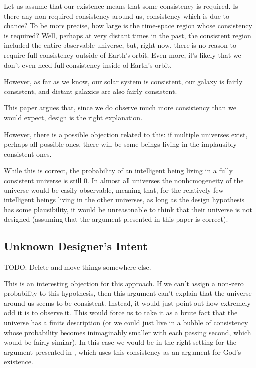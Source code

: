 \documentclass[a4paper
,draft
]{article}
\newcommand{\paper}[1]{paper}
\begin{document}
Let us assume that our existence means that some consistency is required.
Is there any non-required consistency around us, consistency which is due to
chance? To be more precise,
how large is the time-space region whose consistency is required? Well,
perhaps at very distant times in the past, the consistent region included
the entire observable universe, but, right now, there is no reason to require
full consistency outside of Earth's orbit. Even more,
it's likely that we don't even need full consistency inside of Earth's orbit.

However, as far as we know, our solar system is consistent, our galaxy is
fairly consistent, and distant galaxies are also fairly consistent.

This \paper{} argues that, since we do observe much more consistency
than we would expect, design is the right explanation.

However, there is a possible objection related to this: if multiple universes
exist, perhaps all possible ones, there will be some beings living in the
implausibly consistent ones.

While this is correct, the probability of an intelligent being
living in a fully consistent universe is still $0$.
In almost all universes the nonhomogeneity of the universe would be
easily observable, meaning that, for the relatively few intelligent beings
living in the other universes, as long as the design hypothesis
has some plausibility, it would be unreasonable to think that
their universe is not designed (assuming that the argument presented in
this \paper{} is correct).

\subsection{Unknown Designer's Intent}
\label{sec:unknown-designer-intent}

TODO: Delete and move things somewhere else.

This is an interesting objection for this approach.
If we can't assign a
non-zero probability to this hypothesis, then this argument can't explain
that the universe around us seems to be consistent.
Instead, it would just point out how extremely odd it is to observe it.
This would force us to take it as a brute fact that the universe has a
finite description (or we could just
live in a bubble of consistency whose probability becomes inimaginably
smaller with each passing second, which would be fairly similar).
In this case we would be in the right setting for the argument presented in
\cite{Swinburne2004}, which uses this consistency as an argument for God's
existence.
\end{document}
